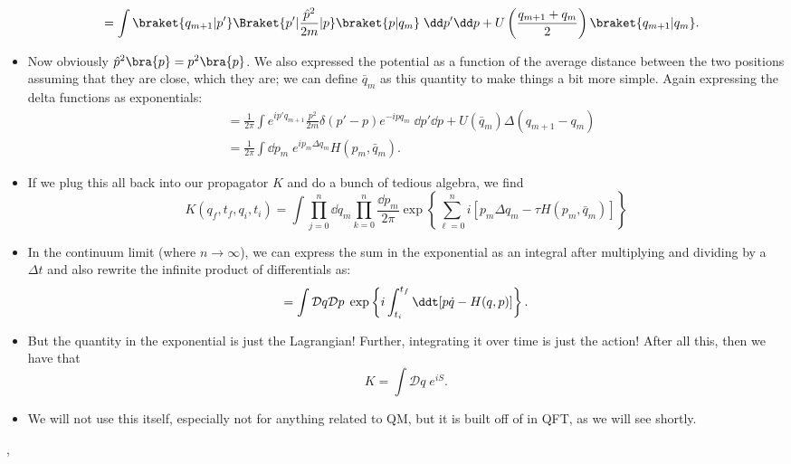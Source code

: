 \begin{itemize}
\begin{align}
            &= \int \braket{q_{m+1} | p'} \Braket{p' | \frac{\hat{p}^2}{2m} | p} \braket{p | q_m} \;\dd p' \dd p + U\left( \frac{q_{m+1} + q_m}{2} \right) \braket{q_{m+1} | q_m}.
        \end{align}
    \item Now obviously $\hat{p}^2\bra{p} = p^2\bra{p}$. We also expressed the potential as a function of the average distance between the two positions assuming that they are close, which they are; we can define $\bar{q}_m$ as this quantity to make things a bit more simple. Again expressing the delta functions as exponentials:
        \begin{align}
            &= \frac{1}{2\pi}\int e^{ip'q_{m+1}} \frac{p^2}{2m} \delta(p' - p) e^{-ipq_m} \;\dd p' \dd p + U(\bar{q}_m)\Delta(q_{m+1} - q_m) \\
            &= \frac{1}{2\pi}\int \dd p_m \; e^{ip_m \Delta q_m} H(p_m, \bar{q}_m).
        \end{align}
    \item If we plug this all back into our propagator $K$ and do a bunch of tedious algebra, we find
        \begin{equation}
            K(q_f,t_f,q_i,t_i) = \int \prod_{j=0}^n \dd q_m \prod_{k=0}^n \frac{\dd p_m}{2\pi} \exp\left\{ \sum_{\ell=0}^n i[p_m \Delta q_m - \tau H(p_m,\bar{q}_m)] \right\}
        \end{equation}
    \item In the continuum limit (where $n\rightarrow\infty$), we can express the sum in the exponential as an integral after multiplying and dividing by a $\Delta t$ and also rewrite the infinite product of differentials as:
        \begin{equation}
            = \int \mathcal{D}q\mathcal{D}p \;\exp\left\{ i\int_{t_i}^{t_f} \ddt [p\dot{q} - H(q,p)] \right\}.
        \end{equation}
    \item But the quantity in the exponential is just the Lagrangian! Further, integrating it over time is just the action! After all this, then we have that
        \begin{equation}
            \boxed{K = \int \mathcal{D}q \; e^{iS}.}
        \end{equation}
    \item We will not use this itself, especially not for anything related to QM, but it is built off of in QFT, as we will see shortly.
\end{itemize}

\sep 


